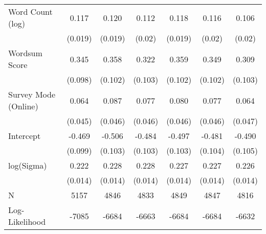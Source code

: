 \begin{table}[ht]
\begin{tabular}{lcccccc}
  Word Count (log) &  0.117 &  0.120 &  0.112 &  0.118 &  0.116 &  0.106 \\ 
   & (0.019) & (0.019) & (0.02) & (0.019) & (0.02) & (0.02) \\ 
  Wordsum Score &  0.345 &  0.358 &  0.322 &  0.359 &  0.349 &  0.309 \\ 
   & (0.098) & (0.102) & (0.103) & (0.102) & (0.102) & (0.103) \\ 
  Survey Mode (Online) &  0.064 &  0.087 &  0.077 &  0.080 &  0.077 &  0.064 \\ 
   & (0.045) & (0.046) & (0.046) & (0.046) & (0.046) & (0.047) \\ 
  Intercept & -0.469 & -0.506 & -0.484 & -0.497 & -0.481 & -0.490 \\ 
   & (0.099) & (0.103) & (0.103) & (0.103) & (0.104) & (0.105) \\ 
  log(Sigma) &  0.222 &  0.228 &  0.228 &  0.227 &  0.227 &  0.226 \\ 
   & (0.014) & (0.014) & (0.014) & (0.014) & (0.014) & (0.014) \\ 
   \hline
N & 5157 & 4846 & 4833 & 4849 & 4847 & 4816 \\ 
  Log-Likelihood & -7085 & -6684 & -6663 & -6684 & -6684 & -6632 \\ 
   \hline
\end{tabular}
\endgroup
\end{table}
